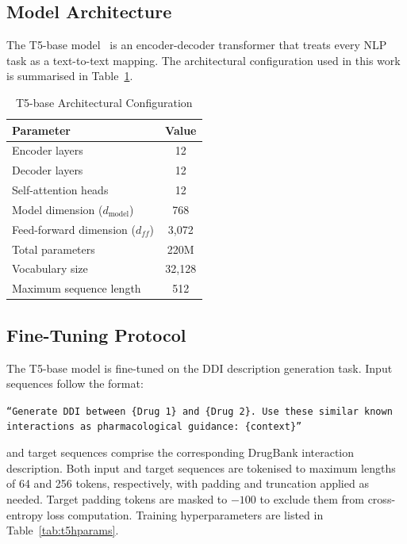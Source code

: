 \documentclass[12pt,a4paper,oneside]{report}
\begin{document}
\subsection{Model Architecture}

The T5-base model~\cite{raffel2020exploring} is an encoder-decoder transformer that treats
every NLP task as a text-to-text mapping. The architectural configuration used in this work
is summarised in Table~\ref{tab:t5config}.

\begin{table}[htbp]
\centering
\caption{T5-base Architectural Configuration}
\label{tab:t5config}
\begin{tabular}{lc}
\toprule
\textbf{Parameter} & \textbf{Value} \\
\midrule
Encoder layers                    & 12      \\
Decoder layers                    & 12      \\
Self-attention heads              & 12      \\
Model dimension ($d_{\text{model}}$) & 768  \\
Feed-forward dimension ($d_{ff}$) & 3,072   \\
Total parameters                  & 220M    \\
Vocabulary size                   & 32,128  \\
Maximum sequence length           & 512     \\
\bottomrule
\end{tabular}
\end{table}

\subsection{Fine-Tuning Protocol}

The T5-base model is fine-tuned on the DDI description generation task. Input sequences
follow the format:

\vspace{4pt}
\noindent\texttt{``Generate DDI between \{Drug\,1\} and \{Drug\,2\}. Use these similar
known interactions as pharmacological guidance: \{context\}''}

\vspace{4pt}
\noindent and target sequences comprise the corresponding DrugBank interaction description.
Both input and target sequences are tokenised to maximum lengths of 64 and 256 tokens,
respectively, with padding and truncation applied as needed. Target padding tokens are masked
to $-100$ to exclude them from cross-entropy loss computation. Training hyperparameters are
listed in Table~\ref{tab:t5hparams}.
\end{document}

